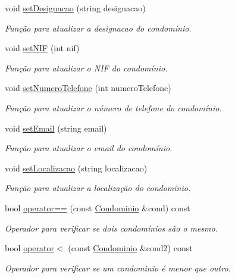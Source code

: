 \begin{DoxyCompactItemize}
void \hyperlink{class_condominio_a54e452fd5905ec95a028cd2dfefbc437}{set\+Designacao} (string designacao)
\begin{DoxyCompactList}\small\item\em Função para atualizar a designacao do condomínio. \end{DoxyCompactList}\item 
void \hyperlink{class_condominio_a89d828306fcbcc0df34d52e07b7e9bb7}{set\+N\+IF} (int nif)
\begin{DoxyCompactList}\small\item\em Função para atualizar o N\+IF do condomínio. \end{DoxyCompactList}\item 
void \hyperlink{class_condominio_a7f454a535fe1ebc3ab244415d963b719}{set\+Numero\+Telefone} (int numero\+Telefone)
\begin{DoxyCompactList}\small\item\em Função para atualizar o número de telefone do condomínio. \end{DoxyCompactList}\item 
void \hyperlink{class_condominio_ae0521eb8186f3c4000cc8c0fa6d4b762}{set\+Email} (string email)
\begin{DoxyCompactList}\small\item\em Função para atualizar o email do condomínio. \end{DoxyCompactList}\item 
void \hyperlink{class_condominio_ae87fcb0812e926dbdf6609f3359b9df9}{set\+Localizacao} (string localizacao)
\begin{DoxyCompactList}\small\item\em Função para atualizar a localização do condomínio. \end{DoxyCompactList}\item 
bool \hyperlink{class_condominio_ad42a7789ca5fc636ff97018f93426055}{operator==} (const \hyperlink{class_condominio}{Condominio} \&cond) const 
\begin{DoxyCompactList}\small\item\em Operador para verificar se dois condomínios são o mesmo. \end{DoxyCompactList}\item 
bool \hyperlink{class_condominio_a522f22fe4aedc504dab8728e73945777}{operator$<$} (const \hyperlink{class_condominio}{Condominio} \&cond2) const 
\begin{DoxyCompactList}\small\item\em Operador para verificar se um condominio é menor que outro. \end{DoxyCompactList}\end{DoxyCompactItemize}
